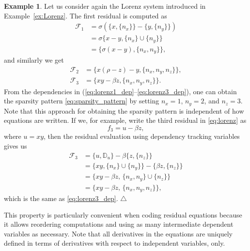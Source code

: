 \documentclass[10pt]{ijnam}
\theoremstyle{definition}
\newtheorem{example}{Example}[section]
\newcommand\xqed[1]{\leavevmode\unskip\penalty9999 \hbox{}\nobreak\hfill \quad\hbox{#1}}
\newcommand{\exampleSymbol}{\xqed{$\triangle$}}
\begin{document}
\begin{example}
Let us consider again the Lorenz system introduced in Example~\ref{ex:Lorenz}. The first residual is computed as
\begin{equation}
    \begin{split} \label{eq:lorenz1_dep}
        \mathcal{F}_1 &= \sigma \left( \{x, \{n_x \}\} - \{y, \{n_y \}\} \right) \\
                      &= \sigma \{ x - y, \{n_x \} \cup \{n_y \} \}              \\
                      &= \{ \sigma(x - y), \{n_x, n_y \} \},
    \end{split}
\end{equation}
and similarly we get
\begin{align}
    \mathcal{F}_2 &= \{x (\rho - z) - y, \{n_x, n_y, n_z \} \}, \label{eq:lorenz2_dep} \\
    \mathcal{F}_3 &= \{x y - \beta z,     \{n_x, n_y, n_z \} \}. \label{eq:lorenz3_dep}
\end{align}
From the dependencies in (\ref{eq:lorenz1_dep}--\ref{eq:lorenz3_dep}), one can obtain the sparsity pattern \eqref{eq:sparsity_pattern} by setting $n_x = 1$, $n_y = 2$, and $n_z = 3$. Note that this approach for obtaining the sparsity pattern is independent of how equations are written. If we, for example, write the third residual in \eqref{eq:lorenz} as  
\begin{equation}
    f_3 = u - \beta z, \label{eq:lorenz3_u}
\end{equation}
where $ u = x y $, then the residual evaluation using dependency tracking variables gives us
\begin{equation}
    \begin{split}
        \mathcal{F}_3 &= \{ u, \mathbb{D}_u \} - \beta \{ z, \{n_z\} \}  \\
                      &= \{ xy, \{n_x \} \cup \{n_y \} \} - \{ \beta z, \{n_z\} \} \\
                      &= \{ xy - \beta z, \, \{n_x, n_y\} \cup \{n_z\} \} \\
                      &= \{ xy - \beta z, \, \{n_x, n_y, n_z \} \},
    \end{split}
\end{equation}
which is the same as \eqref{eq:lorenz3_dep}. \exampleSymbol
\end{example}

This property is particularly convenient when coding residual equations because it allows reordering computations and using as many intermediate dependent variables as necessary. Note that all derivatives in the equations are uniquely defined in terms of derivatives with respect to independent variables, only.
\end{document}
